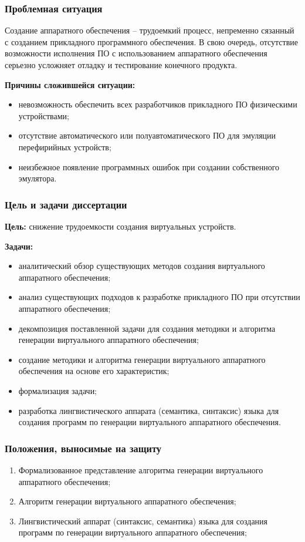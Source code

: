 \begin{frame}%
    \frametitle{Проблемная ситуация}

    Создание аппаратного обеспечения -- трудоемкий процесс,
    непременно сязанный с созданием прикладного программного обеспечения.
    В свою очередь, отсутствие возможности исполнения ПО с использованием аппаратного обеспечения
    серьезно усложняет отладку и тестирование конечного продукта.

    \textbf{Причины сложившейся ситуации:}
    \begin{itemize}
        \item невозможность обеспечить всех разработчиков прикладного ПО физическими устройствами;
        \item отсутствие автоматического или полуавтоматического ПО для эмуляции перефирийных устройств;
        \item неизбежное появление программных ошибок при создании собственного эмулятора.
    \end{itemize}
\end{frame}


\begin{frame}%
    \frametitle{Цель и задачи диссертации}
    \textbf{Цель:} снижение трудоемкости создания виртуальных устройств.

    \textbf{Задачи:}
    \begin{itemize}
        \item аналитический обзор существующих методов создания виртуального аппаратного обеспечения;
        \item анализ существующих подходов к разработке прикладного ПО при отсутствии аппаратного обеспечения;
        \item декомпозиция поставленной задачи для создания методики и алгоритма генерации виртуального аппаратного обеспечения;
        \item создание методики и алгоритма генерации виртуального аппаратного обеспечения на основе его характеристик;
        \item формализация задачи;
        \item разработка лингвистического аппарата (семантика, синтаксис) языка для создания программ по генерации виртуального
            аппаратного обеспечения.
    \end{itemize}
\end{frame}


\begin{frame}%
    \frametitle{Положения, выносимые на защиту}
    \begin{enumerate}
        \item Формализованное представление алгоритма генерации виртуального аппаратного обеспечения;
        \item Алгоритм генерации виртуального аппаратного обеспечения;
        \item Лингвистический аппарат (синтаксис, семантика) языка для создания программ по генерации виртуального
            аппаратного обеспечения;
    \end{enumerate}
\end{frame}



